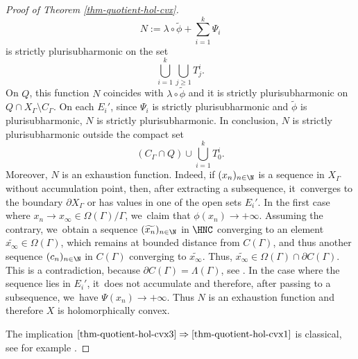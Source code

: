\begin{proof}[Proof of Theorem \ref{thm-quotient-hol-cvx}]
\begin{equation*}
N:= \lambda\circ\widetilde{\phi} + \sum_{i=1}^{k}\Psi_i
\end{equation*}
is strictly plurisubharmonic on the set
\begin{equation*}
\bigcup_{i=1}^{k}\bigcup_{j\ge1}T^{i}_{j}.
\end{equation*}
On $Q$, this function $N$ coincides with $\lambda\circ\widetilde{\phi}$ and it is strictly plurisubharmonic on \hbox{$Q\cap X_{\Gamma}\setminus C_{\Gamma}$}. On each $E_i'$, since $\Psi_i$ is strictly plurisubharmonic and $\widetilde{\phi}$ is plurisubharmonic, $N$ is strictly plurisubharmonic. In conclusion, $N$ is strictly plurisubharmonic outside the compact set
\begin{equation*}
(C_{\Gamma}\cap Q)\cup\bigcup_{i=1}^{k}T^{i}_{0}.
\end{equation*}
Moreover, $N$ is an exhaustion function. Indeed, if $(x_n)_{n\in \N}$ is a sequence in $X_{\Gamma}$ without accumulation point, then, after extracting a subsequence, it~converges to the boundary $\partial X_{\Gamma}$ or has values in one of the open sets $E_i'$. In the first case where $x_n \to x_{\infty}\in \Omega(\Gamma)/\Gamma$, we~claim that $\phi(x_n)\to +\infty$. Assuming the contrary, we~obtain a sequence $(\widetilde{x_n})_{n\in \N}$ in $\HNC$ converging to an element $\widetilde{x_{\infty}}\in \Omega(\Gamma)$, which remains at bounded distance from $C(\Gamma)$, and thus another sequence $(c_n)_{n\in \N}$ in $C(\Gamma)$ converging to $\widetilde{x_{\infty}}$. Thus, $\widetilde{x_{\infty}}\in \Omega(\Gamma) \cap \partial C(\Gamma)$. This is a contradiction, because $\partial C(\Gamma)=\Lambda(\Gamma)$, see \cite{andersonDirichletProblemInfinity1983}. In the case where the sequence lies in $E_i'$, it~does not accumulate and therefore, after passing to a subsequence, we~have $\Psi(x_n)\to +\infty$. Thus $N$ is an exhaustion function and therefore $X$ is holomorphically convex.

The implication $\eqref{thm-quotient-hol-cvx3}\Rightarrow\eqref{thm-quotient-hol-cvx1}$ is classical, see for example \cite[Th.\,I.6.14]{demaillyComplexAnalyticDifferential-manuel}.
\end{proof}


